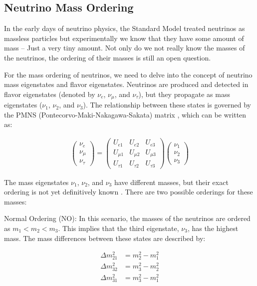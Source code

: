 \subsection{Neutrino Mass Ordering}

In the early days of neutrino physics, the Standard Model treated neutrinos as massless particles but experimentally we know that they have some amount of mass -- Just a very tiny amount.
Not only do we not really know the masses of the neutrinos, the ordering of their masses is still an open question.

For the mass ordering of neutrinos, we need to delve into the concept of neutrino mass eigenstates and flavor eigenstates.
Neutrinos are produced and detected in flavor eigenstates (denoted by $\nu_e$, $\nu_\mu$, and $\nu_\tau$), but they propagate as mass eigenstates ($\nu_1$, $\nu_2$, and $\nu_3$).
The relationship between these states is governed by the PMNS (Pontecorvo-Maki-Nakagawa-Sakata) matrix \cite{PMNS_matrix}, which can be written as:

\begin{align}
  \begin{pmatrix}
    \nu_e \\
    \nu_\mu \\
    \nu_\tau
  \end{pmatrix}
  =
  \begin{pmatrix}
    U_{e1} & U_{e2} & U_{e3} \\
    U_{\mu1} & U_{\mu2} & U_{\mu3} \\
    U_{\tau1} & U_{\tau2} & U_{\tau3}
  \end{pmatrix}
  \begin{pmatrix}
    \nu_1 \\
    \nu_2 \\
    \nu_3
  \end{pmatrix}
\end{align}

The mass eigenstates $\nu_1$, $\nu_2$, and $\nu_3$ have different masses, but their exact ordering is not yet definitively known \cite{De_Angelis_Pimenta_2018}.
There are two possible orderings for these masses:

Normal Ordering (NO): In this scenario, the masses of the neutrinos are ordered as \( m_1 < m_2 < m_3 \).
This implies that the third eigenstate, $\nu_3$, has the highest mass.
The mass differences between these states are described by:

\begin{align}
  \Delta m_{21}^2 &= m_2^2 - m_1^2 \\
  \Delta m_{32}^2 &= m_3^2 - m_2^2 \\
  \Delta m_{31}^2 &= m_3^2 - m_1^2
\end{align}

